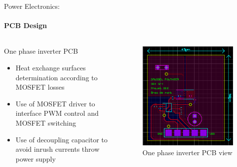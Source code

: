 \documentclass{beamer}
\begin{document}
	\begin{frame}{Power Electronics:}
		\framesubtitle{PCB Design}
		\begin{columns}[T]
	  		\begin{column}{0.6\textwidth}
	  			One phase inverter PCB
		    	\begin{itemize}
		    		\item Heat exchange surfaces determination according to MOSFET losses
		    		\item Use of MOSFET driver to interface PWM control and MOSFET switching
		    		\item Use of decoupling capacitor to avoid inrush currents throw power supply
		    	\end{itemize}
	  		\end{column}
	  		\begin{column}{0.4\textwidth}
	  			\begin{figure}
	  				\begin{center}
	  					\includegraphics[height=0.5\textheight]{../Illus/PCB_Bras_de_pont.PNG}
	  				\end{center}
	    			\caption{One phase inverter PCB view}
	    		\end{figure}
	  		\end{column}
		\end{columns}
	\end{frame}
	
\end{document}
